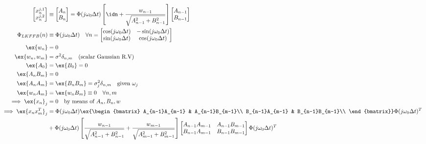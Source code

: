 \begin{align}
\begin{bmatrix} x^{j,1}_{n} \\ x^{j,2}_{n} \\ \end{bmatrix} & \equiv \begin{bmatrix} A_{n} \\ B_{n} \\ \end{bmatrix} = \Phi(j \omega_0 \Delta t) \left[\idn + \frac{w_{n-1}}{\sqrt{A_{n-1}^2 + B_{n-1}^2}} \right] \begin{bmatrix} A_{n-1} \\ B_{n-1} \\ \end{bmatrix} \\
\Phi_{LKFFB}(n) &\equiv  \Phi(j \omega_0 \Delta t) \quad \forall n  = \begin{bmatrix} \cos(j \omega_0 \Delta t) & -\sin(j \omega_0 \Delta t) \\ \sin(j \omega_0 \Delta t) & \cos(j \omega_0 \Delta t) \\ \end{bmatrix} \label{eqn:ap_approxSP:LKFFB_Phi} \\
\ex{w_n} &= 0 \\
\ex{w_n,w_m} &= \sigma^2 \delta_{n,m} \quad \text{(scalar Gaussian R.V)} \\
\ex{A_0} &=\ex{B_0} = 0 \\
\ex{A_n B_m} &= 0 \\
\ex{A_n A_m} &= \ex{B_n B_m} = \sigma_j^2 \delta_{n,m} \quad \text{given $\omega_j$} \\
\ex{w_n A_m} &= \ex{w_n B_m} \equiv 0 \quad  \forall n, m \\
\implies \ex{x_n}_j &= 0 \quad \text{by means of $A_{n}, B_{n}, w$} \\
\implies \ex{x_n x_m^T}_j & =   \Phi(j \omega_0 \Delta t) \ex{\begin{bmatrix} A_{n-1}A_{m-1} & A_{n-1}B_{m-1}\\ B_{n-1}A_{m-1} & B_{n-1}B_{m-1}\\ \end{bmatrix}} \Phi(j \omega_0 \Delta t)^T \label{eqn:cov_kf_term1}\\
& +   \Phi(j \omega_0 \Delta t) \left[\frac{w_{n-1}}{\sqrt{A_{n-1}^2 + B_{n-1}^2}} + \frac{w_{m-1}}{\sqrt{A_{m-1}^2 + B_{m-1}^2}} \right]\begin{bmatrix} A_{n-1}A_{m-1} & A_{n-1}B_{m-1}\\ B_{n-1}A_{m-1} & B_{n-1}B_{m-1}\\ \end{bmatrix} \Phi(j \omega_0 \Delta t)^T  \label{eqn:cov_kf_term2}\\

\end{align}

